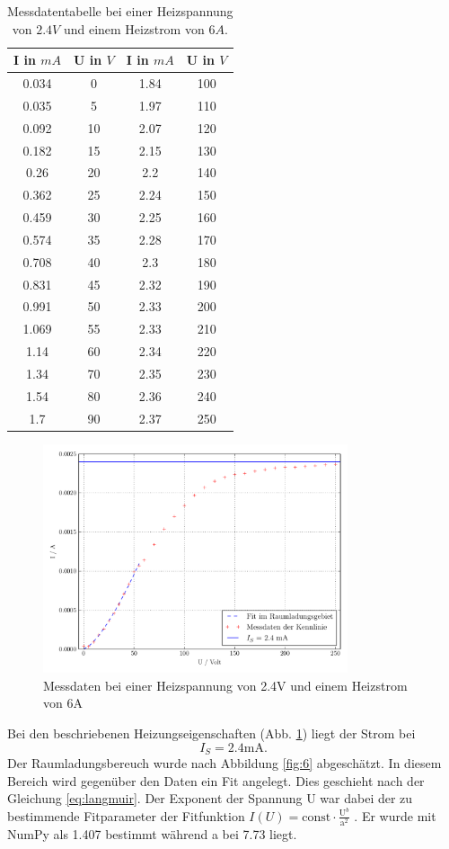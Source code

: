 \begin{table}
 \centering
 \caption{Messdatentabelle bei einer Heizspannung von $2.4V$ und einem Heizstrom von $6A$.}
 \label{tab:daten4}
 \begin{tabular}{|c c|| c c |}  
 \toprule
I in $mA$ & U in $V$ & I in $mA$ & U in $V$\\
\midrule
0.034	&0   &1.84	 &100\\
0.035	&5	 &1.97	 &110\\
0.092	&10	 &2.07	 &120\\
0.182	&15	 &2.15	 &130\\
0.26	&20	 &2.2 	 &140\\
0.362	&25	 &2.24	 &150\\
0.459	&30	 &2.25	 &160\\
0.574	&35	 &2.28	 &170\\
0.708	&40	 &2.3	   &180\\
0.831	&45	 &2.32	 &190\\
0.991	&50	 &2.33	 &200\\
1.069	&55	 &2.33	 &210\\
1.14	&60	 &2.34	 &220\\
1.34	&70	 &2.35	 &230\\
1.54	&80	 &2.36	 &240\\
1.7	  &90	 &2.37	 &250\\
\bottomrule
\end{tabular}
\end{table}


\begin{figure}[H]
  \centering
  \includegraphics[width=0.8\textwidth]{build/Kennlinie4.pdf}
  \caption{Messdaten bei einer Heizspannung von 2.4V und einem Heizstrom von 6A \cite{sample}}
  \label{fig:kenn4}
\end{figure}
Bei den beschriebenen Heizungseigenschaften (Abb. \ref{fig:kenn4}) liegt der Strom bei 
\begin{equation}
I_S = 2.4 \mathrm{mA}.
\label{eq:kenn4ergebnis}
\end{equation}
Der Raumladungsbereuch wurde nach Abbildung \ref{fig:6} abgeschätzt. In diesem Bereich wird
gegenüber den Daten ein Fit angelegt. Dies geschieht nach der Gleichung \eqref{eq:langmuir}. Der Exponent der Spannung U war dabei
der zu bestimmende Fitparameter der Fitfunktion $I (U) = \mathrm{const} \cdot \frac{\mathrm{U}^b}{\mathrm{a}^2}$ . Er wurde mit NumPy \cite{numpy} als 1.407 bestimmt während a bei 7.73 liegt.



